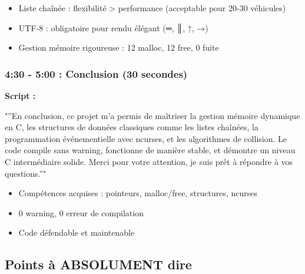 \documentclass[12pt,a4paper]{article}
\newcommand{\sectiontime}[1]{%
    \textcolor{warningorange}{\textbf{#1}}
}
\begin{document}
\begin{points_cles}
\begin{itemize}[leftmargin=0.5cm]
    \item Liste chaînée : flexibilité > performance (acceptable pour 20-30 véhicules)
    \item UTF-8 : obligatoire pour rendu élégant (═, ║, ↑, →)
    \item Gestion mémoire rigoureuse : 12 malloc, 12 free, 0 fuite
\end{itemize}
\end{points_cles}

\subsubsection{\sectiontime{4:30 - 5:00} : Conclusion (30 secondes)}

\begin{script_pitch}
\textbf{Script :}

"''En conclusion, ce projet m'a permis de maîtriser la gestion mémoire dynamique en C, les structures de données classiques comme les listes chaînées, la programmation événementielle avec ncurses, et les algorithmes de collision. Le code compile sans warning, fonctionne de manière stable, et démontre un niveau C intermédiaire solide. Merci pour votre attention, je suis prêt à répondre à vos questions.''"
\end{script_pitch}

\begin{points_cles}
\begin{itemize}[leftmargin=0.5cm]
    \item Compétences acquises : pointeurs, malloc/free, structures, ncurses
    \item 0 warning, 0 erreur de compilation
    \item Code défendable et maintenable
\end{itemize}
\end{points_cles}

\subsection{Points à ABSOLUMENT dire}
\end{document}
